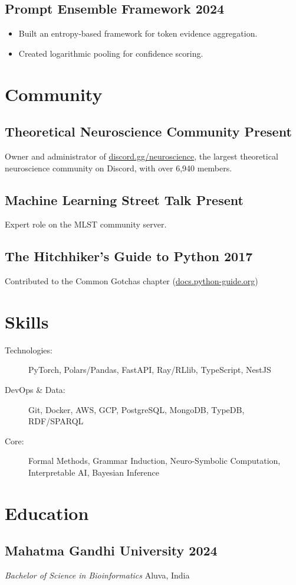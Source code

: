 \documentclass[11pt]{article}
\begin{document}
\subsection{Prompt Ensemble Framework \hspace*{\fill} 2024}
\begin{itemize}
    \item Built an entropy-based framework for token evidence aggregation.
    \item Created logarithmic pooling for confidence scoring.
\end{itemize}

\section{Community}
\subsection{Theoretical Neuroscience Community \hspace*{\fill} Present}
Owner and administrator of \href{https://discord.gg/neuroscience}{discord.gg/neuroscience}, the largest theoretical neuroscience community on Discord, with over 6,940 members.

\subsection{Machine Learning Street Talk \hspace*{\fill} Present}
Expert role on the MLST community server.

\subsection{The Hitchhiker's Guide to Python \hspace*{\fill} 2017}
Contributed to the Common Gotchas chapter (\href{https://docs.python-guide.org/writing/gotchas/}{docs.python-guide.org})

\section{Skills}
\begin{description}
    \item[Technologies:] PyTorch, Polars/Pandas, FastAPI, Ray/RLlib, TypeScript, NestJS
    \item[DevOps \& Data:] Git, Docker, AWS, GCP, PostgreSQL, MongoDB, TypeDB, RDF/SPARQL
    \item[Core:] Formal Methods, Grammar Induction, Neuro-Symbolic Computation, Interpretable AI, Bayesian Inference
\end{description}

\section{Education}
\subsection{Mahatma Gandhi University \hspace*{\fill} 2024}
{\normalfont\textit{Bachelor of Science in Bioinformatics}} \hfill Aluva, India
\end{document}
